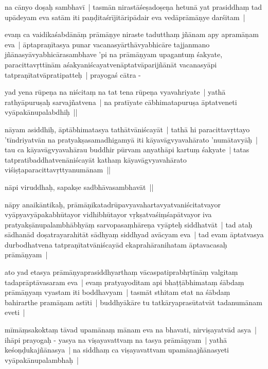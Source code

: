 \documentclass[article,a4paper]{memoir}
\begin{document}
	  \pstart na cā\-nyo doṣaḥ sambhavī\- | tasmā\-n nirastā\-śeṣadoṣeṇa hetunā\- yat prasiddhaṃ tad upā\-deyam eva satā\-m iti paṇḍitaśrī\-jitā\-ripā\-dair eva vedā\-prā\-mā\-ṇye darśitam | 
	\pend
      

	  \pstart evaṃ ca vaidikaśabdā\-nā\-ṃ prā\-mā\-ṇye niraste tadutthaṃ jñā\-nam apy apramā\-ṇam eva | ā\-ptapraṇī\-tasya punar vacanasyā\-rthā\-vyabhicā\-re tajjanmano jñā\-nasyā\-vyabhicā\-rasambhave 'pi na prā\-mā\-ṇyam upagantuṃ śakyate, paracittavṛttī\-nā\-m aśakyaniścayatvenā\-ptatvā\-parijñā\-nā\-t vacanasyā\-pi tatpraṇī\-tatvā\-pratipatteḥ | prayogaś cā\-tra -
	\pend
      

	  \pstart yad yena rū\-peṇa na niścitaṃ na tat tena rū\-peṇa vyavahriyate | yathā\- rathyā\-puruṣaḥ sarvajñatvena | na pratī\-yate cā\-bhimatapuruṣa ā\-ptatveneti vyā\-pakā\-nupalabdhiḥ || 
	\pend
      

	  \pstart nā\-yam asiddhiḥ, ā\-ptā\-bhimatasya tathā\-tvā\-niścayā\-t | tathā\- hi paracittavṛttayo 'tī\-ndriyatvā\-n na pratyakṣasamadhigamyā\- iti kā\-yavā\-gvyavahā\-rato 'numā\-tavyā\-ḥ | tau ca kā\-yavā\-gvyavahā\-rau buddhir pū\-rvam anyathā\-pi kartuṃ śakyate | tatas tatpratibaddhatvenā\-niścayā\-t kathaṃ kā\-yavā\-gvyavahā\-rato viśiṣṭaparacittavṛttyanumā\-nam ||
	\pend
      

	  \pstart nā\-pi viruddhaḥ, sapakṣe sadbhā\-vasambhavā\-t ||
	\pend
      

	  \pstart nā\-py anaikā\-ntikaḥ, prā\-mā\-ṇikatadrū\-pavyavahartavyatvaniścitatvayor vyā\-pyavyā\-pakabhū\-tayor vidhibhū\-tayor vṛkṣatvaśiṃśapā\-tvayor iva pratyakṣā\-nupalambhā\-bhyā\-ṃ sarvopasaṃhā\-reṇa vyā\-pteḥ siddhatvā\-t | tad ataḥ sā\-dhanā\-d doṣatrayarahitā\-t sā\-dhyaṃ siddhyad avā\-cyam eva | tad evam ā\-ptatvasya durbodhatvena tatpraṇī\-tatvā\-niścayā\-d ekaprahā\-ranihatam ā\-ptavacasaḥ prā\-mā\-ṇyam |
	\pend
      

	  \pstart ato yad etasya prā\-mā\-ṇyaprasiddhyarthaṃ vā\-caspatiprabhṛtī\-nā\-ṃ valgitaṃ tadaprā\-ptā\-vasaram eva | evaṃ pratyayoditam api bhaṭṭā\-bhimataṃ śā\-bdaṃ prā\-mā\-ṇyaṃ vyastam iti boddhavyam | tasmā\-t sthitam etat na śā\-bdaṃ bahirarthe pramā\-ṇam astī\-ti | buddhyā\-kā\-re tu tatkā\-ryaprasū\-tatvā\-t tadanumā\-nam eveti |
	\pend
      

	  \pstart mī\-mā\-ṃsakoktaṃ tā\-vad upamā\-naṃ mā\-nam eva na bhavati, nirviṣayatvā\-d asya | ihā\-pi prayogaḥ - yasya na viṣayavattvaṃ na tasya prā\-mā\-ṇyam | yathā\- keśoṇḍukajñā\-nasya | na siddhaṃ ca viṣayavattvam upamā\-najñā\-nasyeti vyā\-pakā\-nupalambhaḥ |
	\pend
      
\end{document}
